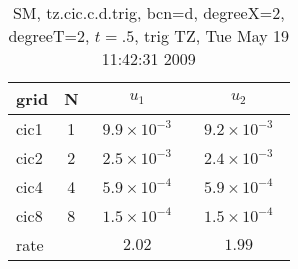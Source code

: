 \begin{table}[hbt]\tableFont %
\begin{center}
\begin{tabular}{|l|c|c|c|} \hline\hline 
grid  & N &  $u_1$ & $u_2$  \\ \hline 
                cic1 &     1 & ~$9.9\times10^{ -3}$~ & ~$9.2\times10^{ -3}$~  \\ \hline
                cic2 &     2 & ~$2.5\times10^{ -3}$~ & ~$2.4\times10^{ -3}$~  \\ \hline
                cic4 &     4 & ~$5.9\times10^{ -4}$~ & ~$5.9\times10^{ -4}$~  \\ \hline
                cic8 &     8 & ~$1.5\times10^{ -4}$~ & ~$1.5\times10^{ -4}$~  \\ \hline
    rate             &       &       $2.02$          &       $1.99$           \\ \hline\hline
\end{tabular}
\caption{SM, tz.cic.c.d.trig, bcn=d, degreeX=2, degreeT=2, $t=.5$, trig TZ, Tue May 19 11:42:31 2009}\label{table:tz.cic.c.d.trig}
\end{center}
\end{table}

